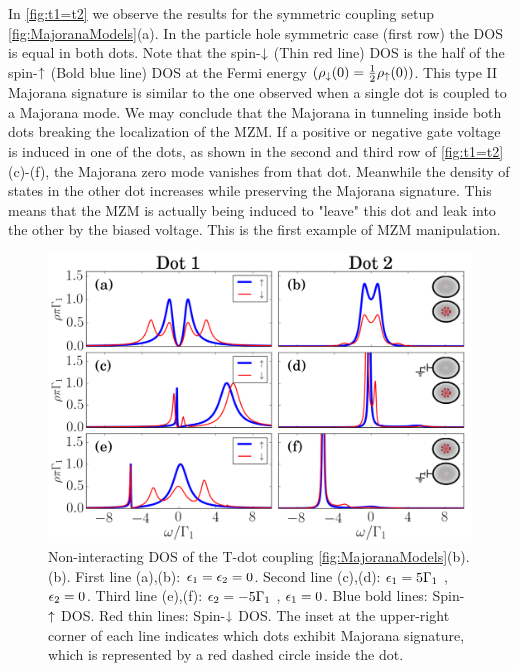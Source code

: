 In \ref{fig:t1=t2} we observe the results for the symmetric coupling setup \ref{fig:MajoranaModels}(a). In the particle hole symmetric case (first row) the DOS is equal in both dots. Note that the spin-$\downarrow$ (Thin red line) DOS is the half of the spin-$\uparrow$ (Bold blue line) DOS at the Fermi energy $(\rho_\downarrow(0) = \frac{1}{2}\rho_\uparrow(0))$. This type II Majorana signature is similar to the one observed when a single dot is coupled to a Majorana mode. \cite{liu_detecting_2011} We may conclude that the Majorana in tunneling inside both dots breaking the localization of the MZM. If a positive or negative gate voltage is induced in one of the dots, as shown in the second and third row of \ref{fig:t1=t2}(c)-(f),  the Majorana zero mode vanishes from that dot. Meanwhile the density of states in the other dot increases while preserving the Majorana signature. This means that the MZM is actually being induced to "leave" this dot and leak into the other by the biased voltage. This is the  first example of MZM manipulation. 


\begin{figure}[bt]
    \begin{center}
    \includegraphics[scale=0.36]{IMAGES/GreenResults/t1>0.png}
    \caption{  \label{fig:t1>0} Non-interacting DOS of the T-dot coupling \ref{fig:MajoranaModels}(b). (b). First line (a),(b): $\epsilon_1=\epsilon_2=0$. Second line (c),(d): $\epsilon_1=5\Gamma_1$ , $\epsilon_2=0$. Third line (e),(f): $\epsilon_2=-5\Gamma_1$ , $\epsilon_1=0$.   Blue bold lines: Spin-$\uparrow$ DOS. Red thin lines: Spin-$\downarrow$ DOS. The inset at the upper-right corner of each line indicates which dots  exhibit  Majorana signature, which is represented by a red dashed circle inside the dot. \protect\Source{}
    }
    \end{center}
\end{figure}

